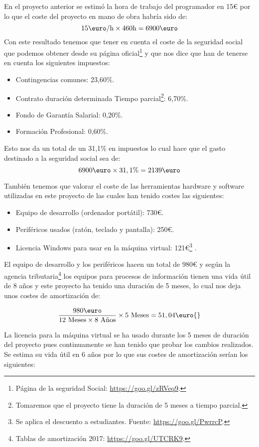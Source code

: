 En el proyecto anterior \cite{perikymataV1} se estimó la hora de trabajo del programador en 15\euro{} por lo que el coste del proyecto en mano de obra habría sido de:
\[15\text{\euro}/\text{h}\times 460\text{h}=6900\text{\euro} \]
Con este resultado tenemos que tener en cuenta el coste de la seguridad social que podemos obtener desde su página oficial\footnote{Página de la seguridad Social: \url{https://goo.gl/zRVeq9}.} y que nos dice que han de tenerse en cuenta los siguientes impuestos:
 \begin{itemize}
     \item Contingencias comunes: 23,60\%.
     \item Contrato duración determinada Tiempo parcial\footnote{Tomaremos que el proyecto tiene la duración de 5 meses a tiempo parcial.}: 6,70\%.
     \item Fondo de Garantía Salarial: 0,20\%.
     \item Formación Profesional: 0,60\%.
 \end{itemize}

Esto nos da un total de un 31,1\% en impuestos lo cual hace que el gasto destinado a la seguridad social sea de:
\[6900\text{\euro}\times 31,1\%=2139\text{\euro} \]

\newpage
También tenemos que valorar el coste de las herramientas hardware y software utilizadas en este proyecto de las cuales han tenido costes las siguientes:
\begin{itemize}
    \item Equipo de desarrollo (ordenador portátil): 730\euro{}.
    \item Periféricos usados (ratón, teclado y pantalla): 250\euro{}.
    \item Licencia Windows para usar en la máquina virtual: 121\euro{}\footnote{Se aplica el descuento a estudiantes. Fuente: \url{https://goo.gl/PwrrcP}.} .
\end{itemize}

El equipo de desarrollo y los periféricos hacen un total de 980\euro{} y según la agencia tributaria\footnote{Tablas de amortización 2017: \url{https://goo.gl/UTCRK9}.} los equipos para procesos de información tienen una vida útil de 8 años y este proyecto ha tenido una duración de 5 meses, 
lo cual nos deja unos costes de amortización de:

\[\frac{980\text{\euro}}{12 \text{ Meses}\times8 \text{ Años}} \times 5 \text{ Meses} =  51,04\text{\euro{}} \]

La licencia para la máquina virtual se ha usado durante los 5 meses de duración del proyecto pues continuamente se han tenido que probar los cambios realizados. Se estima su vida útil en 6 años por lo que sus costes de amortización serían los siguientes:

